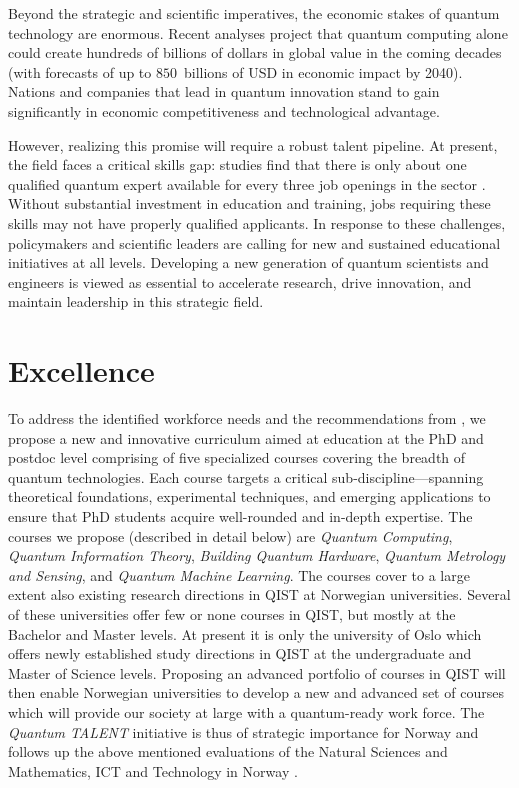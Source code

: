 \documentclass{scrreprt}
\begin{document}
Beyond the strategic and scientific imperatives, the economic stakes
of quantum technology are enormous. Recent analyses project that
quantum computing alone could create hundreds of billions of dollars
in global value in the coming decades \cite{forecast} (with forecasts of up to
$850$~billions of USD in economic impact by 2040). Nations and companies that
lead in quantum innovation stand to gain significantly in economic
competitiveness and technological advantage.

However, realizing this promise will require a robust talent
pipeline. At present, the field faces a critical skills gap: studies
find that there is only about one qualified quantum expert available
for every three job openings in the sector \cite{skillsgap}. Without substantial
investment in education and training, jobs requiring these skills may not have properly qualified applicants. In response to these challenges, policymakers
and scientific leaders are calling for new and sustained educational
initiatives at all levels. Developing a new generation of quantum
scientists and engineers is viewed as essential to accelerate
research, drive innovation, and maintain leadership in this strategic
field.



\section{Excellence}


To address the identified workforce needs and the recommendations from \cite{evalnat,evalmat}, we propose a new and innovative 
curriculum aimed at education at the PhD and postdoc level comprising of five specialized courses covering the breadth of
quantum technologies. Each course targets a critical
sub-discipline—spanning theoretical foundations, experimental
techniques, and emerging applications to ensure that PhD students acquire
well-rounded and in-depth expertise. The courses we propose (described in detail below) are
\textit{Quantum Computing}, \textit{Quantum Information Theory}, \textit{Building Quantum Hardware},
\textit{Quantum Metrology and Sensing}, and \textit{Quantum Machine Learning}. The courses cover to a large extent also existing research directions in QIST at Norwegian universities. Several of these universities offer few or none courses in QIST, but mostly at the Bachelor and Master levels. At present it is only the university of Oslo which offers newly established study directions in QIST at the undergraduate and Master of Science levels. Proposing an advanced portfolio of courses in QIST will then enable Norwegian  universities to develop a new and advanced set of courses which will provide our society at large with a quantum-ready work force. The \textit{Quantum TALENT} initiative is thus of strategic importance for Norway and follows up the above mentioned evaluations of the Natural Sciences and Mathematics, ICT and Technology in Norway \cite{evalnat,evalmat}.
\end{document}
